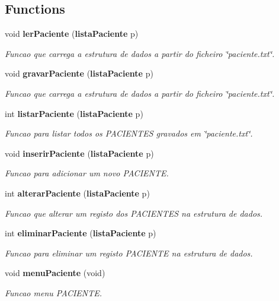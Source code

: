 \subsection*{Functions}
\begin{DoxyCompactItemize}
\item 
void {\bf ler\+Paciente} ({\bf lista\+Paciente} p)
\begin{DoxyCompactList}\small\item\em Funcao que carrega a estrutura de dados a partir do ficheiro \char`\"{}paciente.\+txt\char`\"{}. \end{DoxyCompactList}\item 
void {\bf gravar\+Paciente} ({\bf lista\+Paciente} p)
\begin{DoxyCompactList}\small\item\em Funcao que carrega a estrutura de dados a partir do ficheiro \char`\"{}paciente.\+txt\char`\"{}. \end{DoxyCompactList}\item 
int {\bf listar\+Paciente} ({\bf lista\+Paciente} p)
\begin{DoxyCompactList}\small\item\em Funcao para listar todos os P\+A\+C\+I\+E\+N\+T\+E\+S gravados em \char`\"{}paciente.\+txt\char`\"{}. \end{DoxyCompactList}\item 
void {\bf inserir\+Paciente} ({\bf lista\+Paciente} p)
\begin{DoxyCompactList}\small\item\em Funcao para adicionar um novo P\+A\+C\+I\+E\+N\+T\+E. \end{DoxyCompactList}\item 
int {\bf alterar\+Paciente} ({\bf lista\+Paciente} p)
\begin{DoxyCompactList}\small\item\em Funcao que alterar um registo dos P\+A\+C\+I\+E\+N\+T\+E\+S na estrutura de dados. \end{DoxyCompactList}\item 
int {\bf eliminar\+Paciente} ({\bf lista\+Paciente} p)
\begin{DoxyCompactList}\small\item\em Funcao para eliminar um registo P\+A\+C\+I\+E\+N\+T\+E na estrutura de dados. \end{DoxyCompactList}\item 
void {\bf menu\+Paciente} (void)
\begin{DoxyCompactList}\small\item\em Funcao menu P\+A\+C\+I\+E\+N\+T\+E. \end{DoxyCompactList}\end{DoxyCompactItemize}


